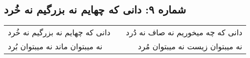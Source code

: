 \begin{center}
\section*{شماره ۹: دانی که چهایم نه بزرگیم نه خُرد}
\label{sec:009}
\begin{longtable}{l p{0.5cm} r}
دانی که چهایم نه بزرگیم نه خُرد
&&
دانی که چه میخوریم نه صاف نه دُرد
\\
نه میبتوان ماند نه میبتوان بُرد
&&
نه میبتوان زیست نه میبتوان مُرد
\\
\end{longtable}
\end{center}
